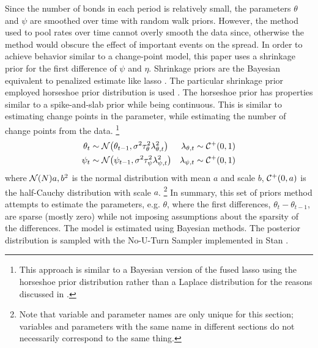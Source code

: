 Since the number of bonds in each period is relatively small, the parameters $\theta$ and $\psi$ are smoothed over time with random walk priors.
However, the method used to pool rates over time cannot overly smooth the data since, otherwise the method would obscure the effect of important events on the spread.
In order to achieve behavior similar to a change-point model, this paper uses a shrinkage prior for the first difference of $\psi$ and $\eta$.
Shrinkage priors are the Bayesian equivalent to penalized estimate like lasso \parencites{Tibshirani1996}{ParkCasella2008}.
The particular shrinkage prior employed horseshoe prior distribution is used \parencites{CarvalhoPolsonScott2009}{CarvalhoPolsonScott2009}.
The horseshoe prior has properties similar to a spike-and-slab prior while being continuous.
This is similar to estimating change points in the parameter, while estimating the number of change points from the data.
\footnote{This approach is similar to a Bayesian version of the fused lasso \textcite{TibshiraniEtAl2005} using the horseshoe prior distribution rather than a Laplace distribution for the reasons discussed in \parencites{CarvalhoPolsonScott2009}{CarvalhoPolsonScott2009}.}
\begin{align}
  \theta_{t} & \sim \mathcal{N}\mathopen{}\left(\theta_{t-1}, \sigma^{2} \tau_{\theta}^{2} \lambda_{\theta,t}^{2}\right)\mathclose{}
  & \lambda_{\theta,t} & \sim \mathcal{C^+}\mathopen{}\left(0, 1\right)\mathclose{} \\
  \psi_{t} & \sim \mathcal{N}\mathopen{}\left(\psi_{t-1}, \sigma^{2} \tau_{\psi}^{2} \lambda_{\psi,t}^{2}\right)\mathclose{}
  & \lambda_{\psi,t} & \sim \mathcal{C^+}\mathopen{}\left(0, 1\right)\mathclose{}
\end{align}
where $\mathcal{N}\mathopen{}\left(N\right)\mathclose{}{a, b^{2}}$ is the normal distribution with mean $a$ and scale $b$, $\mathcal{C^+}\mathopen{}\left(0, a\right)\mathclose{}$ is the half-Cauchy distribution with scale $a$.%
\footnote{Note that variable and parameter names are only unique for this section; variables and parameters with the same name in different sections do not necessarily correspond to the same thing.}
In summary, this set of priors method attempts to estimate the parameters, e.g. $\theta$, where the first differences, $\theta_{t} - \theta_{t-1}$, are sparse (mostly zero) while not imposing assumptions about the sparsity of the differences.
The model is estimated using Bayesian methods.
The posterior distribution is sampled with the No-U-Turn Sampler implemented in Stan \parencites{Stan2014}{HoffmanGelman2013}.


